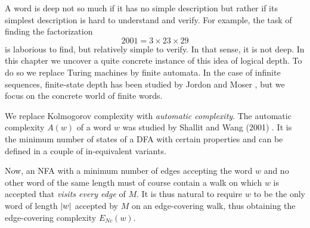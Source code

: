 	A word is deep not so much if it has no simple description but rather if its simplest description is hard to understand and verify. For example, the task of finding the factorization
	\[
	2001 = 3 \times 23 \times 29
	\]
	is laborious to find, but relatively simple to verify. In that sense, it is not deep.
	In this chapter we uncover a quite concrete instance of this idea of logical depth. To do so we replace Turing machines by finite automata.
	In the case of infinite sequences, finite-state depth has been studied by Jordon and Moser \cite{MR4074827}, but we focus on the concrete world of finite words.

	We replace Kolmogorov complexity with \emph{automatic complexity}.
	The automatic complexity $A(w)$ of a word $w$ was studied by Shallit and Wang (2001) \cite{MR1897300}.
	It is the minimum number of states of a DFA with certain properties and can be defined in a couple of in-equivalent variants.
	

	Now, an NFA with a minimum number of edges accepting the word $w$ and no other word of the same length must of course contain a walk on which
	$w$ is accepted that \emph{visits every edge} of $M$.	
	It is thus natural to require $w$ to be the only word of length $\lvert w\rvert$ accepted by $M$ on an edge-covering walk,
	thus obtaining the edge-covering complexity $E_{Nc}(w)$.


